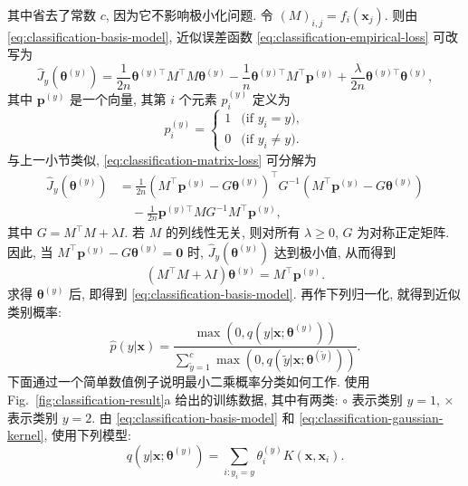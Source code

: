 {其中省去了常数 $c$, 因为它不影响极小化问题. 令 $(M)_{i,j}=f_i(\boldsymbol{x}_j)$. 则由 \eqref{eq:classification-basis-model}, 近似误差函数 \eqref{eq:classification-empirical-loss} 可改写为}
\begin{equation}\label{eq:classification-matrix-loss}
\widehat J_y(\boldsymbol{\theta}^{(y)})=\frac1{2n}\boldsymbol{\theta}^{(y)\top}M^{\top}M\boldsymbol{\theta}^{(y)}-\frac1n\boldsymbol{\theta}^{(y)\top}M^{\top}\boldsymbol{p}^{(y)}+\frac\lambda{2n}\boldsymbol{\theta}^{(y)\top}\boldsymbol{\theta}^{(y)},
\end{equation}
{其中 $\boldsymbol{p}^{(y)}$ 是一个向量, 其第 $i$ 个元素 $p_i^{(y)}$ 定义为}
\[p_i^{(y)}=\begin{cases}1&\text{(if }y_i=y),\\0&\text{(if }y_i\ne y).\end{cases}\]
{与上一小节类似, \eqref{eq:classification-matrix-loss} 可分解为}
\[\begin{aligned}
\widehat J_y(\boldsymbol{\theta}^{(y)})&=\frac1{2n}\left(M^{\top}\boldsymbol{p}^{(y)}-G\boldsymbol{\theta}^{(y)}\right)^{\top}G^{-1}\left(M^{\top}\boldsymbol{p}^{(y)}-G\boldsymbol{\theta}^{(y)}\right)\\
&\quad-\frac1{2n}\boldsymbol{p}^{(y)\top}MG^{-1}M^{\top}\boldsymbol{p}^{(y)},
\end{aligned}\]
{其中 $G=M^{\top}M+\lambda I$. 若 $M$ 的列线性无关, 则对所有 $\lambda\ge0$, $G$ 为对称正定矩阵. 因此, 当 $M^{\top}\boldsymbol{p}^{(y)}-G\boldsymbol{\theta}^{(y)}=\boldsymbol{0}$ 时, $\widehat J_y(\boldsymbol{\theta}^{(y)})$ 达到极小值, 从而得到}
\begin{equation}\label{eq:classification-normal-equations}
(M^{\top}M+\lambda I)\boldsymbol{\theta}^{(y)}=M^{\top}\boldsymbol{p}^{(y)}.
\end{equation}
{求得 $\boldsymbol{\theta}^{(y)}$ 后, 即得到 \eqref{eq:classification-basis-model}. 再作下列归一化, 就得到近似类别概率:}
\[\widehat p(y|\boldsymbol{x})=\frac{\max(0,q(y|\boldsymbol{x};\boldsymbol{\theta}^{(y)}))}{\sum_{\widetilde y=1}^c\max(0,q(\widetilde y|\boldsymbol{x};\boldsymbol{\theta}^{(\widetilde y)}))}.\]
{下面通过一个简单数值例子说明最小二乘概率分类如何工作. 使用 Fig.\ \ref{fig:classification-result}a 给出的训练数据, 其中有两类: $\circ$ 表示类别 $y=1$, $\times$ 表示类别 $y=2$. 由 \eqref{eq:classification-basis-model} 和 \eqref{eq:classification-gaussian-kernel}, 使用下列模型:}
\[q(y|\boldsymbol{x};\boldsymbol{\theta}^{(y)})=\sum_{i:y_i=y}\theta_i^{(y)}K(\boldsymbol{x},\boldsymbol{x}_i).\]
